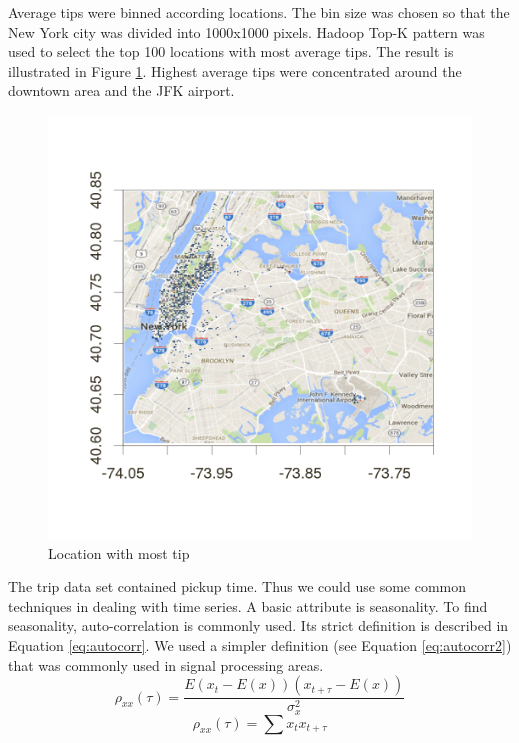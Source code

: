 \documentclass[12pt,a4paper]{article}
\begin{document}
  Average tips were binned according locations. The bin size was chosen so that the New York city was divided into 1000x1000 pixels. Hadoop Top-K pattern was used to select the top 100 locations with most average tips. The result is illustrated in Figure \ref{fig:toplatlog}. Highest average tips were concentrated around the downtown area and the JFK airport.
  \begin{figure}[h]
    \centering
    \caption{Location with most tip}
    \label{fig:toplatlog}
    \includegraphics[scale=0.2]{plot/map}
  \end{figure}


  The trip data set contained pickup time. Thus we could use some common techniques in dealing with time series. A basic attribute is seasonality. To find seasonality, auto-correlation is commonly used. Its strict definition is described in Equation \ref{eq:autocorr}. We used a simpler definition (see Equation \ref{eq:autocorr2}) that was commonly used in signal processing areas.
  \begin{equation}
    \label{eq:autocorr}
    \rho_{xx}(\tau) =\frac{E(x_{t}-E(x))(x_{t+\tau}-E(x))}{\sigma_x^2}
  \end{equation}
  \begin{equation}
    \label{eq:autocorr2}
    \rho_{xx}(\tau) =\sum{x_{t}x_{t+\tau}}
  \end{equation}
\end{document}
